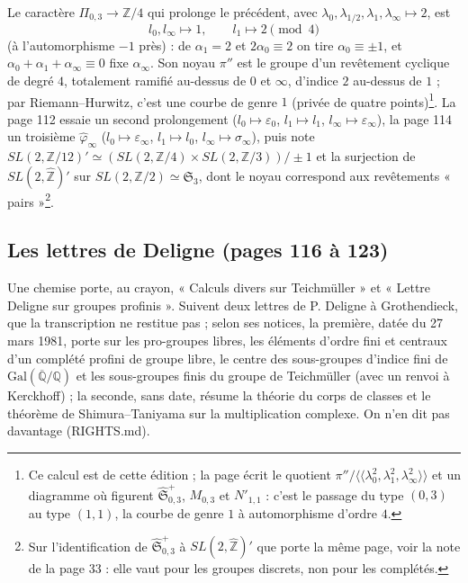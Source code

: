 \documentclass[11pt,a4paper]{article}
\begin{document}
Le caractère $\Pi_{0,3} \to \mathbb{Z}/4$ qui prolonge le précédent, avec
$\lambda_0, \lambda_{1/2}, \lambda_1, \lambda_\infty \mapsto 2$, est
\[
l_0, l_\infty \mapsto 1, \qquad l_1 \mapsto 2 \pmod 4
\]
(à l'automorphisme $-1$ près) : de $\alpha_1 = 2$ et $2\alpha_0 \equiv 2$ on tire
$\alpha_0 \equiv \pm 1$, et $\alpha_0 + \alpha_1 + \alpha_\infty \equiv 0$ fixe
$\alpha_\infty$. Son noyau $\pi''$ est le groupe d'un revêtement cyclique de
degré $4$, totalement ramifié au-dessus de $0$ et $\infty$, d'indice $2$
au-dessus de $1$ ; par Riemann–Hurwitz, c'est une courbe de genre $1$ (privée
de quatre points)\footnote{Ce calcul est de cette édition ; la page écrit le
quotient $\pi''/\langle\langle\lambda_0^2, \lambda_1^2, \lambda_\infty^2\rangle\rangle$
et un diagramme où figurent $\hat{\mathfrak{S}}^{+}_{0,3}$, $M_{0,3}$ et
$N'_{1,1}$ : c'est le passage du type $(0,3)$ au type $(1,1)$, la courbe de
genre $1$ à automorphisme d'ordre $4$.}. La page 112 essaie un second
prolongement ($l_0 \mapsto \varepsilon_0$, $l_1 \mapsto l_1$,
$l_\infty \mapsto \varepsilon_\infty$), la page 114 un troisième
$\hat\varphi_\infty$ ($l_0 \mapsto \varepsilon_\infty$, $l_1 \mapsto l_0$,
$l_\infty \mapsto \sigma_\infty$), puis note
$SL(2, \mathbb{Z}/12)' \simeq (SL(2, \mathbb{Z}/4) \times SL(2, \mathbb{Z}/3))/\pm 1$
et la surjection de $SL(2, \widehat{\mathbb{Z}})'$ sur
$SL(2, \mathbb{Z}/2) \simeq \mathfrak{S}_3$, dont le noyau correspond aux
revêtements « pairs »\footnote{Sur l'identification de
$\hat{\mathfrak{S}}^{+}_{0,3}$ à $SL(2, \widehat{\mathbb{Z}})'$ que porte la même
page, voir la note de la page 33 : elle vaut pour les groupes discrets, non
pour les complétés.}.

\subsection*{Les lettres de Deligne (pages 116 à 123)}

Une chemise porte, au crayon, « Calculs divers sur Teichmüller » et « Lettre
Deligne sur groupes profinis ». Suivent deux lettres de P. Deligne à
Grothendieck, que la transcription ne restitue pas ; selon ses notices, la
première, datée du 27 mars 1981, porte sur les pro-groupes libres, les éléments
d'ordre fini et centraux d'un complété profini de groupe libre, le centre des
sous-groupes d'indice fini de $\mathrm{Gal}(\overline{\mathbb{Q}}/\mathbb{Q})$ et
les sous-groupes finis du groupe de Teichmüller (avec un renvoi à Kerckhoff) ;
la seconde, sans date, résume la théorie du corps de classes et le théorème de
Shimura–Taniyama sur la multiplication complexe. On n'en dit pas davantage
(RIGHTS.md).
\end{document}
